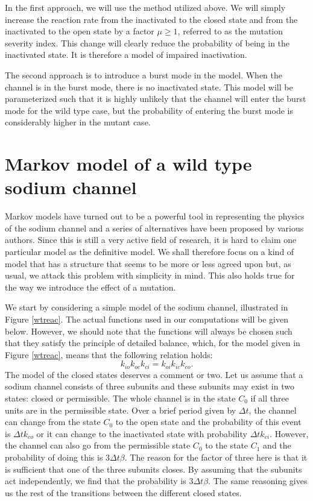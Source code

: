  In the first approach, we will use the method
utilized above. We will simply increase the reaction rate from the inactivated
to the closed state and from the inactivated to the open state by a factor
$\mu\ge1$, referred to as the mutation severity index. This change will clearly
reduce the probability of being in the inactivated state. 
It is therefore a model of impaired inactivation.

The second approach is
to introduce a burst mode in the model. When the channel is in the burst mode,
there is no inactivated state. This model will be
parameterized such that it is highly unlikely that the channel will enter the
burst mode for the wild type case, but the probability of entering the burst
mode is considerably higher in the mutant case.

\section{Markov model of a wild type sodium channel}

Markov models have turned out to be a powerful tool in representing the physics
of the sodium channel and a series of alternatives have been proposed by
various authors. Since this is still a very active field of research, it is hard
to claim one particular model as the definitive model. We
shall therefore focus on a kind of model that has a structure that seems to
be more or less agreed upon but, as usual, we attack this problem with
simplicity in mind. This also holds true for the way we introduce the effect
of a mutation.

We start by considering a simple model of the sodium channel, illustrated in
Figure \ref{wtreac}. The actual functions used in our computations will be
given below. However, we should note that the functions will always be chosen
such that they satisfy the principle of detailed balance, which, for the model
given in Figure \ref{wtreac}, means that the following relation holds:
\begin{equation}
k_{io}k_{oc}k_{ci}=k_{oi}k_{ic}k_{co}. \label{db2}
\end{equation}
The model of the closed states deserves a comment or two. Let us assume that a
sodium channel consists of three subunits and these subunits may exist in two
states: closed or permissible. The whole channel is in the state $C_{0}$ if
all three units are in the permissible state. Over a brief period given
by $\Delta t$, the channel can change from the state $C_{0}$ to the open
state and the probability of this event is $\Delta t k_{co}$ or it can
change to the inactivated state with probability $\Delta t k_{ci}$. However, the
channel can also go from the permissible state $C_{0}$ to the state $C_{1}$ and 
the probability of doing this is $3\Delta t \beta$. The reason for the factor 
of three here is that it is sufficient that one of the three subunits closes. By
assuming that the subunits act independently, we find that the probability is
$3\Delta t \beta$. The same reasoning gives us the rest of the
transitions between the different closed states.

